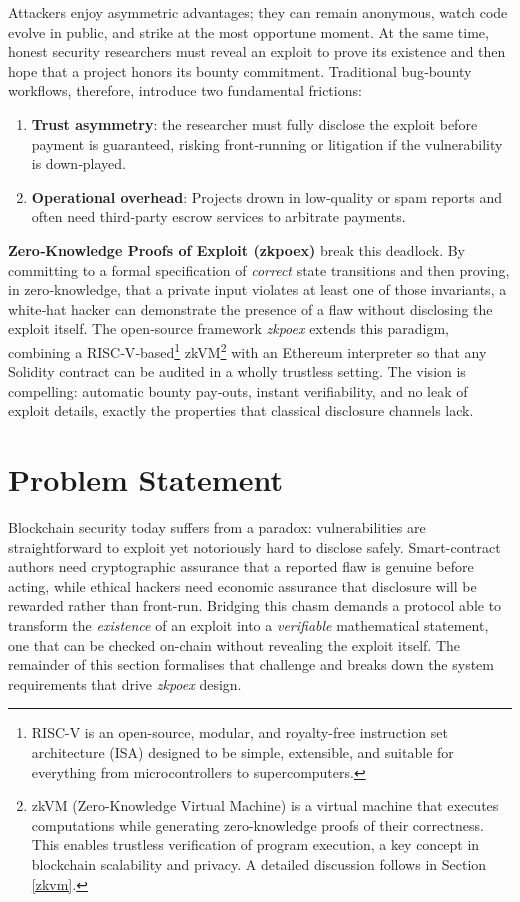 Attackers enjoy asymmetric advantages; they can remain anonymous, watch code evolve in public, and strike at the most opportune moment. At the same time, honest security researchers must reveal an exploit to prove its existence and then hope that a project honors its bounty commitment.
Traditional bug‑bounty workflows, therefore, introduce two fundamental frictions:

\begin{enumerate}
    \item \textbf{Trust asymmetry}: the researcher must fully disclose the exploit before payment is guaranteed, risking front‑running or litigation if the vulnerability is down‑played.
    \item \textbf{Operational overhead}: Projects drown in low‑quality or spam reports and often need third‑party escrow services to arbitrate payments.
\end{enumerate}

\noindent
\textbf{Zero‑Knowledge Proofs of Exploit (zkpoex)} break this deadlock.  
By committing to a formal specification of \textit{correct} state transitions and then proving, in zero‑knowledge, that a private input violates at least one of those invariants, a white‑hat hacker can demonstrate the presence of a flaw without disclosing the exploit itself.  
The open‑source framework \textit{zkpoex}\cite{zkpoex} extends this paradigm, combining a RISC‑V‑based\footnote{RISC-V is an open-source, modular, and royalty-free instruction set architecture (ISA) designed to be simple, extensible, and suitable for everything from microcontrollers to supercomputers.}
 zkVM\footnote{zkVM (Zero-Knowledge Virtual Machine) is a virtual machine that executes computations while generating zero-knowledge proofs of their correctness. This enables trustless verification of program execution, a key concept in blockchain scalability and privacy. A detailed discussion follows in Section \ref{zkvm}. } with an Ethereum interpreter so that any Solidity contract can be audited in a wholly trustless setting.
The vision is compelling: automatic bounty pay‑outs, instant verifiability, and no leak of exploit details, exactly the properties that classical disclosure channels lack.

\section{Problem Statement}\label{sec:core-problem}
Blockchain security today suffers from a paradox: vulnerabilities are straightforward to exploit yet notoriously hard to disclose safely. Smart-contract authors need cryptographic assurance that a reported flaw is genuine before acting, while ethical hackers need economic assurance that disclosure will be rewarded rather than front-run.  Bridging this chasm demands a protocol able to transform the \textit{existence} of an exploit into a \textit{verifiable} mathematical statement, one that can be checked on-chain without revealing the exploit itself. The remainder of this section formalises that challenge and breaks down the system requirements that drive \textit{zkpoex} design.

